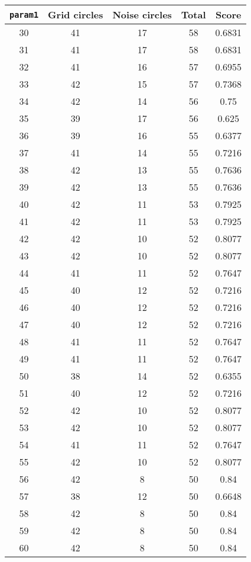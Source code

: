 \documentclass[letterpaper, 12pt]{article}
\begin{document}
\begin{longtable}{|c|c|c|c|c|}
\hline
\textbf{\texttt{param1}} & \textbf{Grid circles} & \textbf{Noise circles} & \textbf{Total} & \textbf{Score} \\
\hline
30 & 41 & 17 & 58 & 0.6831 \\
\hline
31 & 41 & 17 & 58 & 0.6831 \\
\hline
32 & 41 & 16 & 57 & 0.6955 \\
\hline
33 & 42 & 15 & 57 & 0.7368 \\
\hline
34 & 42 & 14 & 56 & 0.75 \\
\hline
35 & 39 & 17 & 56 & 0.625 \\
\hline
36 & 39 & 16 & 55 & 0.6377 \\
\hline
37 & 41 & 14 & 55 & 0.7216 \\
\hline
38 & 42 & 13 & 55 & 0.7636 \\
\hline
39 & 42 & 13 & 55 & 0.7636 \\
\hline
40 & 42 & 11 & 53 & 0.7925 \\
\hline
41 & 42 & 11 & 53 & 0.7925 \\
\hline
42 & 42 & 10 & 52 & 0.8077 \\
\hline
43 & 42 & 10 & 52 & 0.8077 \\
\hline
44 & 41 & 11 & 52 & 0.7647 \\
\hline
45 & 40 & 12 & 52 & 0.7216 \\
\hline
46 & 40 & 12 & 52 & 0.7216 \\
\hline
47 & 40 & 12 & 52 & 0.7216 \\
\hline
48 & 41 & 11 & 52 & 0.7647 \\
\hline
49 & 41 & 11 & 52 & 0.7647 \\
\hline
50 & 38 & 14 & 52 & 0.6355 \\
\hline
51 & 40 & 12 & 52 & 0.7216 \\
\hline
52 & 42 & 10 & 52 & 0.8077 \\
\hline
53 & 42 & 10 & 52 & 0.8077 \\
\hline
54 & 41 & 11 & 52 & 0.7647 \\
\hline
55 & 42 & 10 & 52 & 0.8077 \\
\hline
56 & 42 & 8 & 50 & 0.84 \\
\hline
57 & 38 & 12 & 50 & 0.6648 \\
\hline
58 & 42 & 8 & 50 & 0.84 \\
\hline
59 & 42 & 8 & 50 & 0.84 \\
\hline
60 & 42 & 8 & 50 & 0.84 \\

\end{longtable}
\end{document}
